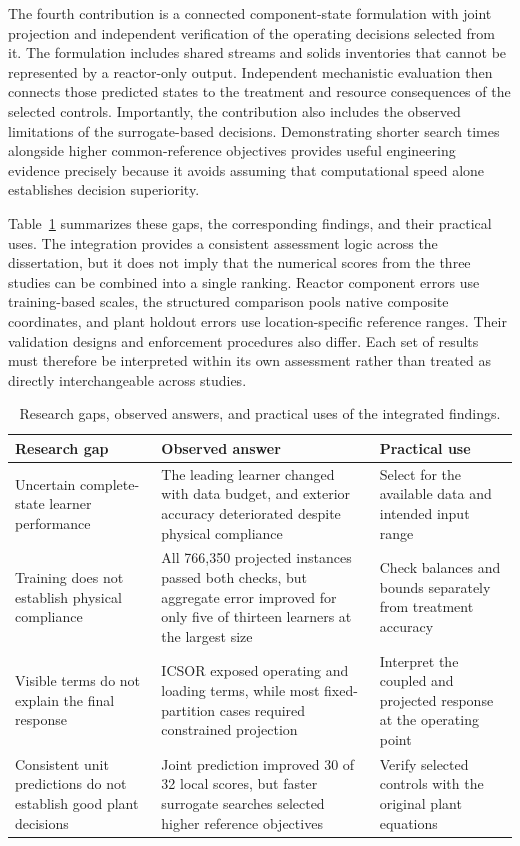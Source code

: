 The fourth contribution is a connected component-state formulation with joint projection and independent verification of the operating decisions selected from it. The formulation includes shared streams and solids inventories that cannot be represented by a reactor-only output. Independent mechanistic evaluation then connects those predicted states to the treatment and resource consequences of the selected controls. Importantly, the contribution also includes the observed limitations of the surrogate-based decisions. Demonstrating shorter search times alongside higher common-reference objectives provides useful engineering evidence precisely because it avoids assuming that computational speed alone establishes decision superiority.

Table~\ref{tab:integrated_observed_findings} summarizes these gaps, the corresponding findings, and their practical uses. The integration provides a consistent assessment logic across the dissertation, but it does not imply that the numerical scores from the three studies can be combined into a single ranking. Reactor component errors use training-based scales, the structured comparison pools native composite coordinates, and plant holdout errors use location-specific reference ranges. Their validation designs and enforcement procedures also differ. Each set of results must therefore be interpreted within its own assessment rather than treated as directly interchangeable across studies.

\begin{table}[htbp]
\centering\small
\caption{Research gaps, observed answers, and practical uses of the integrated findings.}
\label{tab:integrated_observed_findings}
\begin{tabular}{>{\raggedright\arraybackslash}p{}>{\raggedright\arraybackslash}p{}>{\raggedright\arraybackslash}p{}}
\toprule
Research gap & Observed answer & Practical use\\
\midrule
Uncertain complete-state learner performance & The leading learner changed with data budget, and exterior accuracy deteriorated despite physical compliance & Select for the available data and intended input range\\
Training does not establish physical compliance & All 766,350 projected instances passed both checks, but aggregate error improved for only five of thirteen learners at the largest size & Check balances and bounds separately from treatment accuracy\\
Visible terms do not explain the final response & ICSOR exposed operating and loading terms, while most fixed-partition cases required constrained projection & Interpret the coupled and projected response at the operating point\\
Consistent unit predictions do not establish good plant decisions & Joint prediction improved 30 of 32 local scores, but faster surrogate searches selected higher reference objectives & Verify selected controls with the original plant equations\\
\bottomrule
\end{tabular}
\end{table}

